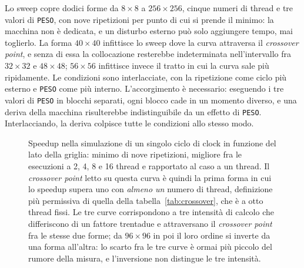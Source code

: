 Lo sweep copre dodici forme da $8\times8$ a $256\times256$, cinque numeri di thread e tre valori di \texttt{PESO}, con nove ripetizioni per punto di cui si
prende il minimo: la macchina non è dedicata, e un disturbo esterno può
solo aggiungere tempo, mai toglierlo. La forma $40\times40$ infittisce lo sweep
dove la curva attraversa il \emph{crossover point}, e senza di essa la collocazione
resterebbe indeterminata nell'intervallo fra $32\times32$ e $48\times48$;
$56\times56$ infittisce invece il tratto in cui la curva sale più
ripidamente. Le condizioni sono interlacciate, con la ripetizione come
ciclo più esterno e \texttt{PESO} come più interno. L'accorgimento è necessario: eseguendo i tre valori di \texttt{PESO} in blocchi separati, ogni
blocco cade in un momento diverso, e una deriva della macchina risulterebbe
indistinguibile da un effetto di \texttt{PESO}. Interlacciando, la deriva colpisce tutte le condizioni
allo stesso modo.

\begin{figure}[htbp]
    \centering
    \caption{Speedup nella simulazione di un singolo ciclo di clock in funzione del lato della griglia: minimo di
             nove ripetizioni, migliore fra le esecuzioni a 2, 4, 8 e 16 thread
             e rapportato al caso a un thread. Il \emph{crossover point} letto su questa
             curva è quindi la prima forma in cui lo speedup supera uno con \emph{almeno un} numero di thread, definizione più permissiva di quella della
             tabella~\ref{tab:crossover}, che è a otto thread fissi. Le tre
             curve corrispondono a tre intensità di calcolo che differiscono di
             un fattore trentadue e attraversano il \emph{crossover point} fra le stesse due
             forme; da $96\times96$ in poi il loro ordine si inverte da una forma
             all'altra: lo scarto fra le tre curve è ormai più piccolo del
             rumore della misura, e l'inversione non distingue le tre
             intensità.}
    \label{fig:crossover}
\end{figure}

